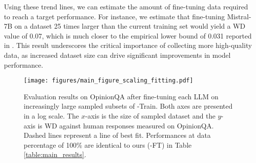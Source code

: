 Using these trend lines, we can estimate the amount of fine-tuning data required to reach a target performance. For instance, we estimate that fine-tuning Mistral-7B on a dataset 25 times larger than the current \OURDATA training set would yield a WD value of 0.07, which is much closer to the empirical lower bound of 0.031 reported in .
This result underscores the critical importance of collecting more high-quality data, as increased dataset size can drive significant improvements in model performance.

\begin{figure}[!t]
    \centering
    \captionsetup{font=small}
    \texttt{[image: figures/main\_figure\_scaling\_fitting.pdf]}
    \caption{
    Evaluation results on OpinionQA after fine-tuning each LLM on increasingly large sampled subsets of \OURDATA-Train.
    Both axes are presented in a log scale.
    The $x$-axis is the size of sampled dataset and the $y$-axis is WD against human responses measured on OpinionQA.
    Dashed lines represent a line of best fit.
    Performances at data percentage of 100\% are identical to ours (\OURDATA-FT) in Table \ref{table:main_results}.
    }
    \label{fig:scaling}
\end{figure}
